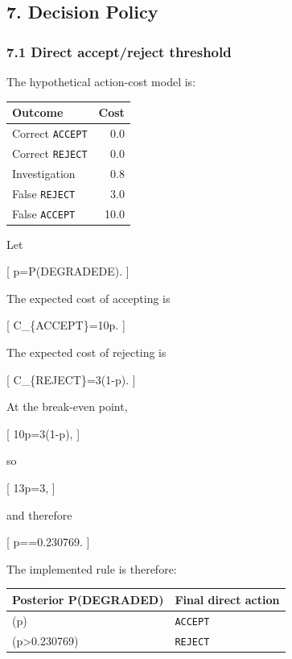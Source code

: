 \documentclass[
]{article}
\begin{document}
\subsection{7. Decision Policy}\label{decision-policy}

\subsubsection{7.1 Direct accept/reject
threshold}\label{direct-acceptreject-threshold}

The hypothetical action-cost model is:

\begin{longtable}[]{@{}lr@{}}
\toprule\noalign{}
Outcome & Cost \\
\midrule\noalign{}
\endhead
\bottomrule\noalign{}
\endlastfoot
Correct \texttt{ACCEPT} & 0.0 \\
Correct \texttt{REJECT} & 0.0 \\
Investigation & 0.8 \\
False \texttt{REJECT} & 3.0 \\
False \texttt{ACCEPT} & 10.0 \\
\end{longtable}

Let

{[} p=P(DEGRADED\mid E). {]}

The expected cost of accepting is

{[} C\_\{ACCEPT\}=10p. {]}

The expected cost of rejecting is

{[} C\_\{REJECT\}=3(1-p). {]}

At the break-even point,

{[} 10p=3(1-p), {]}

so

{[} 13p=3, {]}

and therefore

{[} p==0.230769. {]}

The implemented rule is therefore:

\begin{longtable}[]{@{}ll@{}}
\toprule\noalign{}
Posterior P(DEGRADED) & Final direct action \\
\midrule\noalign{}
\endhead
\bottomrule\noalign{}
\endlastfoot
(p\le 0.230769) & \texttt{ACCEPT} \\
(p\textgreater0.230769) & \texttt{REJECT} \\
\end{longtable}
\end{document}
